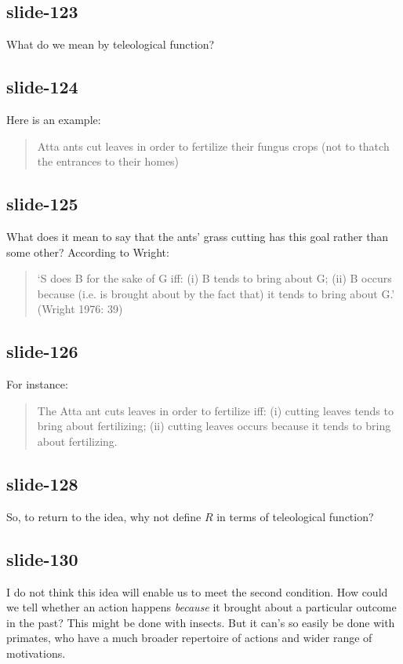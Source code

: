 \documentclass[12pt,\papersize]{extarticle}
\begin{document}
 
\subsection{slide-123}
What do we mean by teleological function?
 
 
\subsection{slide-124}
Here is an example: 
\begin{quote}
Atta ants cut leaves in order to fertilize their fungus crops (not to thatch the entrances to their homes) \citep{Schultz:1999ps}
\end{quote}
 
 
\subsection{slide-125}
What does it mean to say that the ants’ grass cutting has this goal rather than some other? According to Wright: \begin{quote}
‘S does B for the sake of G iff: (i) B tends to bring about G; (ii) B occurs because (i.e. is brought about by the fact that) it tends to bring about G.’ (Wright 1976: 39)
\end{quote}
 
 
\subsection{slide-126}
For instance: 
\begin{quote}
The Atta ant cuts leaves in order to fertilize iff: (i) cutting leaves tends to bring about fertilizing; (ii) cutting leaves occurs because it tends to bring about fertilizing.
\end{quote}
 
 
\subsection{slide-128}
So, to return to the idea, why not define $R$ in terms of teleological function?
 
 
\subsection{slide-130}
I do not think this idea will enable us to meet the second condition. How could we tell whether an action happens \emph{because} it brought about a particular outcome in the past? This might be done with insects. But it can's so easily be done with primates, who have a much broader repertoire of actions and wider range of motivations.
 
\end{document}

